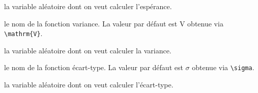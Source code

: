 \documentclass[12pt,a4paper]{article}
\begin{document}
\IDarg{} la variable aléatoire dont on veut calculer l'espérance.


\separation



\IDoption{} le nom de la fonction variance. La valeur par défaut est $\mathrm{V}$ obtenue via \verb#\mathrm{V}#.

\IDarg{} la variable aléatoire dont on veut calculer la variance.


\separation



\IDoption{} le nom de la fonction écart-type. La valeur par défaut est $\sigma$ obtenue via \verb#\sigma#.

\IDarg{} la variable aléatoire dont on veut calculer l'écart-type.
\end{document}
